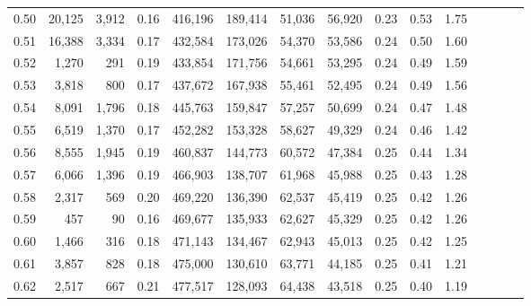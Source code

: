 \begin{tabular}{rrrcrrrrrrrrrrr}
0.50 &  20,125 &  3,912 &                                       0.16 &  416,196 &  189,414 &   51,036 &   56,920 &  0.23 &  0.53 &                         1.75 \\
0.51 &  16,388 &  3,334 &                                       0.17 &  432,584 &  173,026 &   54,370 &   53,586 &  0.24 &  0.50 &                         1.60 \\
0.52 &   1,270 &    291 &                                       0.19 &  433,854 &  171,756 &   54,661 &   53,295 &  0.24 &  0.49 &                         1.59 \\
0.53 &   3,818 &    800 &                                       0.17 &  437,672 &  167,938 &   55,461 &   52,495 &  0.24 &  0.49 &                         1.56 \\
0.54 &   8,091 &  1,796 &                                       0.18 &  445,763 &  159,847 &   57,257 &   50,699 &  0.24 &  0.47 &                         1.48 \\
0.55 &   6,519 &  1,370 &                                       0.17 &  452,282 &  153,328 &   58,627 &   49,329 &  0.24 &  0.46 &                         1.42 \\
0.56 &   8,555 &  1,945 &                                       0.19 &  460,837 &  144,773 &   60,572 &   47,384 &  0.25 &  0.44 &                         1.34 \\
0.57 &   6,066 &  1,396 &                                       0.19 &  466,903 &  138,707 &   61,968 &   45,988 &  0.25 &  0.43 &                         1.28 \\
0.58 &   2,317 &    569 &                                       0.20 &  469,220 &  136,390 &   62,537 &   45,419 &  0.25 &  0.42 &                         1.26 \\
0.59 &     457 &     90 &                                       0.16 &  469,677 &  135,933 &   62,627 &   45,329 &  0.25 &  0.42 &                         1.26 \\
0.60 &   1,466 &    316 &                                       0.18 &  471,143 &  134,467 &   62,943 &   45,013 &  0.25 &  0.42 &                         1.25 \\
0.61 &   3,857 &    828 &                                       0.18 &  475,000 &  130,610 &   63,771 &   44,185 &  0.25 &  0.41 &                         1.21 \\
0.62 &   2,517 &    667 &                                       0.21 &  477,517 &  128,093 &   64,438 &   43,518 &  0.25 &  0.40 &                         1.19 \\

\end{tabular}
